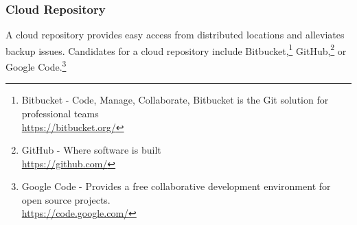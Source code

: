 
\newpage
\subsubsection{Cloud Repository}
A cloud repository provides easy access from distributed
locations and alleviates backup issues.  Candidates for
a cloud repository include Bitbucket,\footnote{Bitbucket - Code, Manage, Collaborate,
Bitbucket is the Git solution for professional teams\\
\href{https://bitbucket.org/}{https://bitbucket.org/}}
GitHub,\footnote{GitHub - Where software is built\\
\href{https://github.com/}{https://github.com/}}
or Google Code.\footnote{Google Code - Provides a free collaborative development environment
for open source projects.\\
\href{https://code.google.com/}{https://code.google.com/}}


